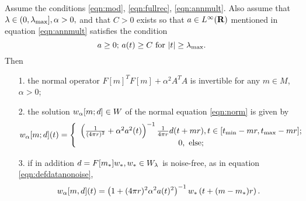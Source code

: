 \begin{proposition}
  \label{thm:norminvexp}
  Assume the conditions \ref{eqn:mod}, \ref{eqn:fullrec},
  \ref{eqn:annmult}. Also assume that $\lambda \in (0,\lambda_{\rm
    max}], \alpha > 0,$ and that  $C>0$ exists so that $a \in L^{\infty}({\bf R})$
  mentioned in equation \ref{eqn:annmult} satisfies the condition
  \begin{equation}
    \label{eqn:abnd} 
    a \ge 0; \, a(t) \ge C\mbox{ for }|t| \ge \lambda_{\rm max}.
  \end{equation}
  Then
  \begin{itemize}
  \item[1. ]the normal operator $F[m]^TF[m] + \alpha^2A^TA$ is
    invertible for any $m \in M$, $\alpha > 0$;
  \item[2. ]the solution $w_{\alpha}[m;d]\in W$ of the normal equation
    \ref{eqn:norm} is given by
    \begin{equation}
      \label{eqn:normsol}
      w_{\alpha}[m;d](t) = \left\{
        \begin{array}{c}
          \left(\frac{1}{(4\pi r)^2} + \alpha^2
          a^2(t)\right)^{-1}\frac{1}{4 \pi r}d(t+mr), t \in [t_{\rm
          min}-mr, t_{\rm max}-mr];\\
          0, \mbox{ else;}
        \end{array}
      \right.
    \end{equation}
  \item[3. ]if in addition $d=F[m_*]w_*, w_* \in W_{\lambda}$ is noise-free, as in equation
    \ref{eqn:defdatanonoise},
    \begin{equation}
      \label{eqn:solnonoise}
      w_{\alpha}[m,d](t)= \left(1+ (4\pi r)^2\alpha^2 a(t)^2\right)^{-1}w_*\left(t+(m-m_*)r\right).
    \end{equation}
  \end{itemize}
\end{proposition}

